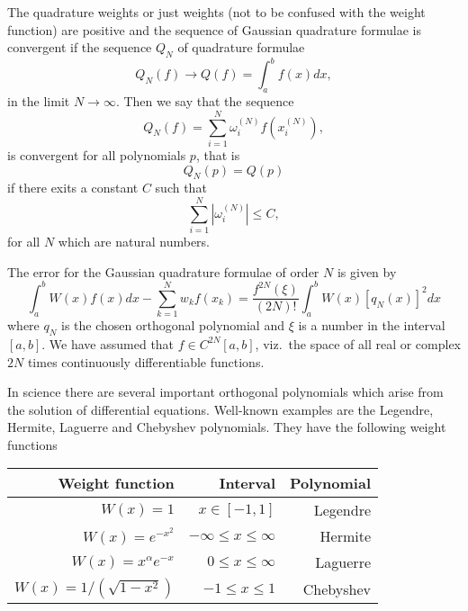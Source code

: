 The quadrature weights or just weights (not to be confused with the weight function) 
are positive and the sequence of Gaussian quadrature formulae is convergent 
if the sequence $Q_N$ of quadrature formulae 
\[
   Q_N(f)\rightarrow Q(f)=\int_a^bf(x)dx,
\]
in the limit $N\rightarrow \infty$. 
Then  we say that the sequence 
\[ Q_N(f) = \sum_{i=1}^N\omega_i^{(N)}f(x_i^{(N)}), \]
is convergent for all polynomials $p$, that is 
\[Q_N(p) = Q(p) \]
if there exits a constant $C$ such that 
\[
 \sum_{i=1}^N|\omega_i^{(N)}| \le C,
\]
for all $N$ which are natural numbers.

The error for the Gaussian quadrature formulae of order $N$ is given
by
\[
  \int_a^bW(x)f(x)dx-\sum_{k=1}^Nw_kf(x_k)=\frac{f^{2N}(\xi)}{(2N)!}\int_a^bW(x)[q_{N}(x)]^2dx
\]
where $q_{N}$ is the chosen orthogonal polynomial and $\xi$ is a number in the interval $[a,b]$.
We have assumed that $f\in C^{2N}[a,b]$, viz.~the space of all real or complex  $2N$ times continuously
differentiable functions. 



In science there are several important orthogonal polynomials which arise
from the solution of differential equations. Well-known examples are the  
Legendre, Hermite, Laguerre and Chebyshev polynomials. They have the following weight functions
\begin{center}
\begin{tabular}{rrr}\hline
Weight function&Interval&Polynomial \\\hline
  $W(x)=1$  &$x\in [-1,1]$    &Legendre      \\
  $W(x)=e^{-x^2}$  &$-\infty \le x \le \infty$    &Hermite      \\
  $W(x)=x^{\alpha}e^{-x}$  &$0 \le x \le \infty$    &Laguerre      \\
  $W(x)=1/(\sqrt{1-x^2})$  &$-1 \le x \le 1$    &Chebyshev      \\ \hline
\end{tabular}  
\end{center}  

